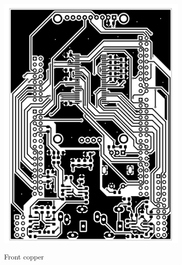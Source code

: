\documentclass[a4paper,twoside,12pt]{book}
\begin{document}
\begin{figure}[H]
    \centering
    \begin{subfigure}[h]{0.3\textwidth}
        \includegraphics[width=\textwidth]{images/Board_front}
        \label{fig:board1}
        \caption{Front copper}
    \end{subfigure}
    ~
    \begin{subfigure}[h]{0.3\textwidth}

\end{subfigure}
\end{figure}
\end{document}
